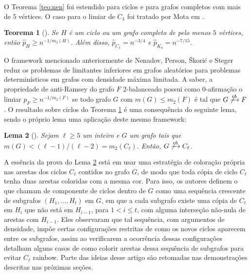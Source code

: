 \documentclass[12pt,a4paper]{book}
\newtheorem{teorema}{Teorema}[chapter]
\newtheorem{lema}      [teorema] {Lema}
\begin{document}
O Teorema \ref{teo:nen} foi estendido para ciclos \cite{barros2021anti} e para grafos completos \cite{kohayakawa2019anti} com mais de 5 vértices. 
O caso para o limiar de $C_4$ foi tratado por Mota em \cite{mota2017advances}.

\begin{teorema}    
[\cite{barros2021anti, kohayakawa2019anti, mota2017advances}]
\label{teo:cyclecomplete} 
Se $H$ é um ciclo ou um grafo completo de pelo menos $5$ vértices, 
então $\hat{p}_{H} \geq n^{-1/m_2(H)}$. 
Além disso, $\hat{p}_{C_4} = n^{-3/4}$ 
e $\hat{p}_{K_4} = n^{-7/15}$.
\end{teorema}

    O framework mencionado anteriormente de Nenadov,
Person, Škorić e Steger~\cite{NePeSkSt14} reduz os problemas de limitantes inferiores  em grafos aleatórios para problemas determinísticos em grafos com densidade máxima limitada. 
A saber, a propriedade de anti-Ramsey do grafo $F$ 2-balanceado possui como $0$-afirmação o limiar $p_F \geq n^{-1/m_2(F)}$ se todo grafo $G$ com $m(G) \leq m_2(F)$ é tal que $G \not\xrightarrow[]{rb} F$.
O resultado sobre ciclos do Teorema \ref{teo:cyclecomplete} é uma consequência do seguinte lema, sendo o próprio lema uma aplicação deste mesmo framework:
    
\begin{lema}[\cite{barros2021anti}]\label{lema:rbciclos}
         Sejam $\ell \geq 5$ um inteiro e $G$ um grafo tais que
         ${m(G) < (\ell-1)/(\ell-2) = m_2(C_\ell)}$. 
         Então, $G \not\xrightarrow[]{rb} C_\ell$.
\end{lema}
    
A essência da prova do Lema \ref{lema:rbciclos} está em usar uma estratégia de coloração própria nas arestas dos ciclos $C_\ell$ contidos no grafo $G$, de modo que toda cópia de ciclo $C_\ell$ tenha duas arestas coloridas com a mesma cor.
%
Para isso, os autores definem o que chamam de componente de ciclos dentro de $G$ como uma sequência crescente de subgrafos $(H_1, \ldots, H_t)$ em $G$, em que a cada subgrafo existe uma cópia de $C_\ell$ em $H_{i}$ que não está em $H_{i-1}$, para $1 < i \leq t$, com alguma interseção não-nula de arestas com $H_{i-1}$.
%
Eles observaram que tal sequência, com argumentos de densidade, impõe certas configurações restritas de como os novos ciclos aparecem entre os subgrafos, assim ao verificarem a ocorrência dessas configurações detalham alguns casos de como colorir arestas dessa sequência de subgrafos para evitar $C_\ell$ rainbow.
     Parte das ideias desse artigo são retomadas nas demonstrações descritas nas próximas seções.
 
\end{document}
